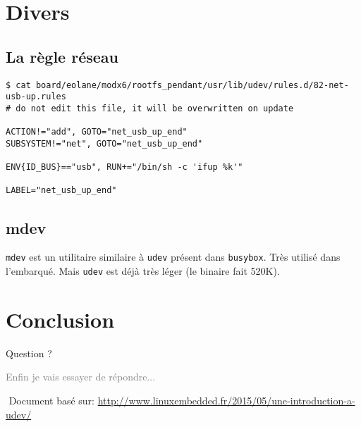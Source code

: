 \documentclass[compress,aspectratio=169]{beamer}
\begin{document}

\section{Divers}

\subsection{La règle réseau}

\begin{frame}[fragile]
\begin{lstlisting}[style=shell]
$ cat board/eolane/modx6/rootfs_pendant/usr/lib/udev/rules.d/82-net-usb-up.rules 
# do not edit this file, it will be overwritten on update

ACTION!="add", GOTO="net_usb_up_end"
SUBSYSTEM!="net", GOTO="net_usb_up_end"

ENV{ID_BUS}=="usb", RUN+="/bin/sh -c 'ifup %k'"

LABEL="net_usb_up_end"
\end{lstlisting}
\end{frame}

\subsection{mdev}
\begin{frame}[fragile]
\texttt{mdev} est un utilitaire similaire à \texttt{udev} présent dans \texttt{busybox}. Très utilisé dans l'embarqué.\newline
\newline
Mais \texttt{udev} est déjà très léger (le binaire fait 520K).
\end{frame}


\section*{Conclusion}
\begin{frame}
\begin{center}
\begin{huge}
Question ?
\end{huge}
\end{center}
\begin{center}
\textcolor{gray}{\tiny{Enfin je vais essayer de répondre...}}
\end{center}
$ $\newline
\newline
Document basé sur:\newline
\url{http://www.linuxembedded.fr/2015/05/une-introduction-a-udev/}
\end{frame}
\end{document}
